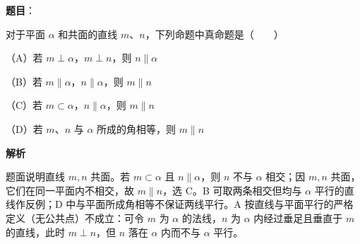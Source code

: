 \begin{answer}

\textbf{题目}：

对于平面 $\alpha$ 和共面的直线 $m$、$n$，下列命题中真命题是\mbox{（　　）}

（A）若 $m\perp\alpha$，$m\perp n$，则 $n\parallel\alpha$

（B）若 $m\parallel\alpha$，$n\parallel\alpha$，则 $m\parallel n$

（C）若 $m\subset\alpha$，$n\parallel\alpha$，则 $m\parallel n$

（D）若 $m$、$n$ 与 $\alpha$ 所成的角相等，则 $m\parallel n$

\textbf{解析}

题面说明直线 $m,n$ 共面。若 $m\subset\alpha$ 且 $n\parallel\alpha$，则 $n$ 不与 $\alpha$ 相交；因 $m,n$ 共面，它们在同一平面内不相交，故 $m\parallel n$，选 C。B 可取两条相交但均与 $\alpha$ 平行的直线作反例；D 中与平面所成角相等不保证两线平行。A 按直线与平面平行的严格定义（无公共点）不成立：可令 $m$ 为 $\alpha$ 的法线，$n$ 为 $\alpha$ 内经过垂足且垂直于 $m$ 的直线，此时 $m\perp n$，但 $n$ 落在 $\alpha$ 内而不与 $\alpha$ 平行。


\end{answer}
